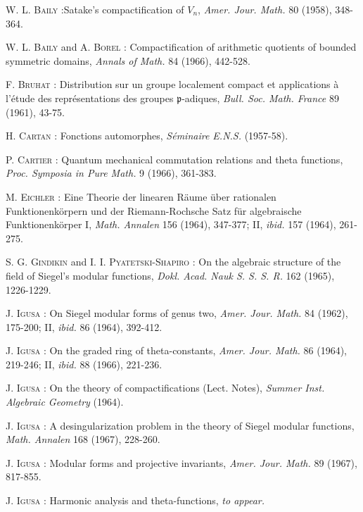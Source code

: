 \begin{thebibliography}{99}
 \textsc{W. L. Baily :}\pageoriginale Satake's compactification of $V_{n}$, {\em Amer. Jour. Math.} 80 (1958), 348-364.

 \textsc{W. L. Baily} and \textsc{A. Borel :} Compactification of arithmetic quotients of bounded symmetric domains, {\em Annals of Math.} 84 (1966), 442-528.

 \textsc{F. Bruhat :} Distribution sur un groupe localement compact et applications \`a l'\'etude des repr\'esentations des groupes $\mathfrak{p}$-adiques, {\em Bull. Soc. Math. France} 89 (1961), 43-75.

 \textsc{H. Cartan :} Fonctions automorphes, {\em S\'eminaire E.N.S.} (1957-58).

 \textsc{P. Cartier :} Quantum mechanical commutation relations and theta functions, {\em Proc. Symposia in Pure Math.} 9 (1966), 361-383.

 \textsc{M. Eichler :} Eine Theorie der linearen R\"aume \"uber rationalen Funktionenk\"orpern und der Riemann-Rochsche Satz f\"ur algebraische Funktionenk\"orper I, {\em Math. Annalen} 156 (1964), 347-377; II, {\em ibid.} 157 (1964), 261-275.

 \textsc{S. G. Gindikin} and \textsc{I. I. Pyatetski-Shapiro :} On the algebraic structure of the field of Siegel's modular functions, {\em Dokl. Acad. Nauk S. S. S. R.} 162 (1965), 1226-1229.

 \textsc{J. Igusa :} On Siegel modular forms of genus two, {\em Amer. Jour. Math.} 84 (1962), 175-200; II, {\em ibid.} 86 (1964), 392-412.

 \textsc{J. Igusa :} On the graded ring of theta-constants, {\em Amer. Jour. Math.} 86 (1964), 219-246; II, {\em ibid.} 88 (1966), 221-236.

 \textsc{J. Igusa :} On the theory of compactifications (Lect. Notes), {\em Summer Inst. Algebraic Geometry} (1964).

 \textsc{J. Igusa :} A desingularization problem in the theory of Siegel modular functions, {\em Math. Annalen} 168 (1967), 228-260. 

 \textsc{J. Igusa :} Modular forms and projective invariants, {\em Amer. Jour. Math.} 89 (1967), 817-855.

 \textsc{J. Igusa :} Harmonic analysis and theta-functions, {\em to appear.}


\end{thebibliography}

